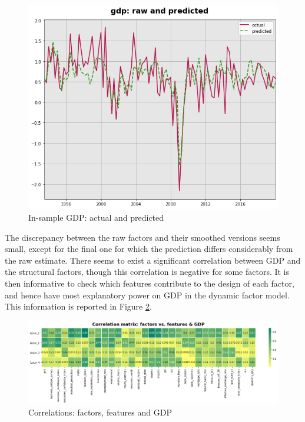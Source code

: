 \begin{figure}[H]
\centering
\includegraphics[scale=0.4]{images/dfm_gdp.png}
\caption{In-sample GDP: actual and predicted}
\label{fig_c3_s1_ss2_2}
\end{figure}

The discrepancy between the raw factors and their smoothed versions seems small, except for the final one for which the prediction differs considerably from the raw estimate. There seems to exist a significant correlation between GDP and the structural factors, though this correlation is negative for some factors. It is then informative to check which features contribute to the design of each factor, and hence have most explanatory power on GDP in the dynamic factor model. This information is reported in Figure \ref{fig_c3_s1_ss2_3}.

\begin{figure}[H]
\centering
\includegraphics[scale=0.43]{images/factor_correlations.png}
\caption{Correlations: factors, features and GDP}
\label{fig_c3_s1_ss2_3} \vspace{-8mm}
\end{figure}

